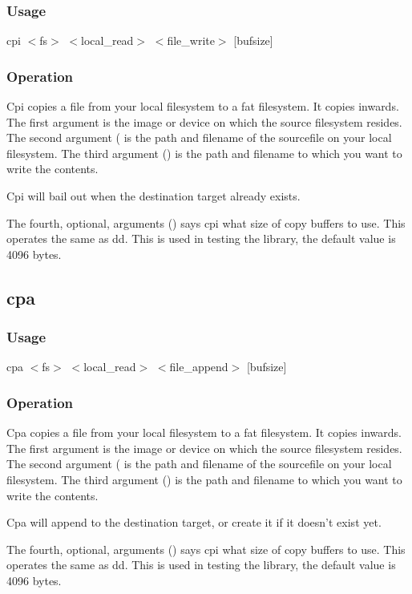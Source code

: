     \subsubsection*{Usage}
	cpi $<$fs$>$ $<$local\_read$>$ $<$file\_write$>$ [bufsize]
    \subsubsection*{Operation}
	Cpi copies a file from your local filesystem to a fat filesystem. It copies inwards.
        The first argument  is the image or device on which the source
        filesystem resides. The second argument ( is the path and filename
        of the sourcefile on your local filesystem. The third argument () is the
        path and filename to which you want to write the contents.

        Cpi will bail out when the destination target already exists.

        The fourth, optional, arguments () says cpi what size of copy buffers
        to use. This operates the same as dd. This is used in testing the library, the
        default value is 4096 bytes.

\subsection{cpa}
    \subsubsection*{Usage}
	cpa $<$fs$>$ $<$local\_read$>$ $<$file\_append$>$ [bufsize]
    \subsubsection*{Operation}
	Cpa copies a file from your local filesystem to a fat filesystem. It copies inwards.
        The first argument  is the image or device on which the source
        filesystem resides. The second argument ( is the path and filename
        of the sourcefile on your local filesystem. The third argument () is the
        path and filename to which you want to write the contents.

        Cpa will append to the destination target, or create it if it doesn't exist yet.

        The fourth, optional, arguments () says cpi what size of copy buffers
        to use. This operates the same as dd. This is used in testing the library, the
        default value is 4096 bytes.

